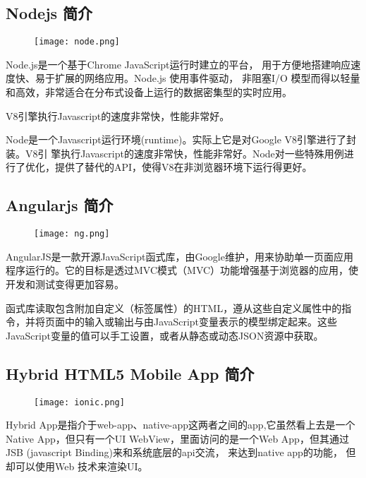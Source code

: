 	

\subsection{Nodejs 简介}

\begin{figure}[H]
	\centering
	\texttt{[image: node.png]}
	\label{fig: node}
\end{figure}


Node.js是一个基于Chrome JavaScript运行时建立的平台， 用于方便地搭建响应速度快、易于扩展的网络应用。Node.js 使用事件驱动， 非阻塞I/O 模型而得以轻量和高效，非常适合在分布式设备上运行的数据密集型的实时应用。


V8引擎执行Javascript的速度非常快，性能非常好。

Node是一个Javascript运行环境(runtime)。实际上它是对Google V8引擎进行了封装。V8引 擎执行Javascript的速度非常快，性能非常好。Node对一些特殊用例进行了优化，提供了替代的API，使得V8在非浏览器环境下运行得更好。

\subsection{Angularjs 简介}

\begin{figure}[H]
	\centering
	\texttt{[image: ng.png]}
	\label{fig: angular}
\end{figure}

AngularJS是一款开源JavaScript函式库，由Google维护，用来协助单一页面应用程序运行的。它的目标是透过MVC模式（MVC）功能增强基于浏览器的应用，使开发和测试变得更加容易。

函式库读取包含附加自定义（标签属性）的HTML，遵从这些自定义属性中的指令，并将页面中的输入或输出与由JavaScript变量表示的模型绑定起来。这些JavaScript变量的值可以手工设置，或者从静态或动态JSON资源中获取。

\subsection{Hybrid HTML5 Mobile App 简介}

\begin{figure}[H]
	\centering
	\texttt{[image: ionic.png]}
	\label{fig: had}
\end{figure}



Hybrid App是指介于web-app、native-app这两者之间的app,它虽然看上去是一个Native App，但只有一个UI WebView，里面访问的是一个Web App，但其通过JSB (javascript Binding)来和系统底层的api交流， 来达到native app的功能， 但却可以使用Web 技术来渲染UI。


